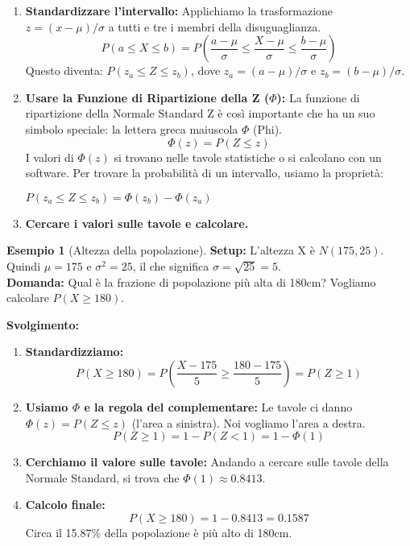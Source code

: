 \documentclass[a4paper, 11pt]{article}
\theoremstyle{definition}
\newtheorem{esempio}{Esempio}[section]
\begin{document}
\begin{tcolorbox}[colback=green!5!white, colframe=green!60!black, title=La strategia in 3 passi]
\begin{enumerate}
    \item \textbf{Standardizzare l'intervallo:} Applichiamo la trasformazione $z = (x - \mu) / \sigma$ a tutti e tre i membri della disuguaglianza.
    \[ P(a \le X \le b) = P\left(\frac{a-\mu}{\sigma} \le \frac{X-\mu}{\sigma} \le \frac{b-\mu}{\sigma}\right) \]
    Questo diventa: $P(z_a \le Z \le z_b)$, dove $z_a = (a-\mu)/\sigma$ e $z_b = (b-\mu)/\sigma$.

    \item \textbf{Usare la Funzione di Ripartizione della Z ($\Phi$):}
    La funzione di ripartizione della Normale Standard Z è così importante che ha un suo simbolo speciale: la lettera greca maiuscola $\Phi$ (Phi).
    \[ \Phi(z) = P(Z \le z) \]
    I valori di $\Phi(z)$ si trovano nelle tavole statistiche o si calcolano con un software. Per trovare la probabilità di un intervallo, usiamo la proprietà:
    \begin{formulabox}
        $P(z_a \le Z \le z_b) = \Phi(z_b) - \Phi(z_a)$
    \end{formulabox}

    \item \textbf{Cercare i valori sulle tavole e calcolare.}
\end{enumerate}
\end{tcolorbox}

\begin{esempio}[Altezza della popolazione]
\textbf{Setup:} L'altezza X è $N(175, 25)$. Quindi $\mu = 175$ e $\sigma^2 = 25$, il che significa $\sigma = \sqrt{25} = 5$. \\
\textbf{Domanda:} Qual è la frazione di popolazione più alta di 180cm? Vogliamo calcolare $P(X \ge 180)$.

\textbf{Svolgimento:}
\begin{enumerate}
    \item \textbf{Standardizziamo:}
    \[ P(X \ge 180) = P\left(\frac{X-175}{5} \ge \frac{180-175}{5}\right) = P(Z \ge 1) \]

    \item \textbf{Usiamo $\Phi$ e la regola del complementare:}
    Le tavole ci danno $\Phi(z) = P(Z \le z)$ (l'area a sinistra). Noi vogliamo l'area a destra.
    \[ P(Z \ge 1) = 1 - P(Z < 1) = 1 - \Phi(1) \]

    \item \textbf{Cerchiamo il valore sulle tavole:}
    Andando a cercare sulle tavole della Normale Standard, si trova che $\Phi(1) \approx 0.8413$.

    \item \textbf{Calcolo finale:}
    \[ P(X \ge 180) = 1 - 0.8413 = 0.1587 \]
    Circa il 15.87\% della popolazione è più alto di 180cm.
\end{enumerate}
\end{esempio}
\end{document}
